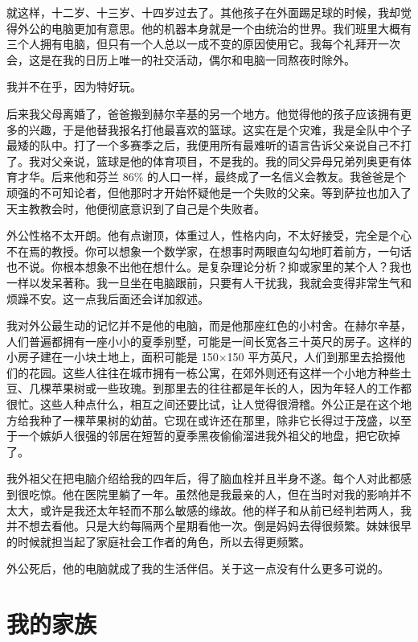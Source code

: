 就这样，十二岁、十三岁、十四岁过去了。其他孩子在外面踢足球的时候，我却觉得外公的电脑更加有意思。他的机器本身就是一个由统治的世界。我们班里大概有三个人拥有电脑，但只有一个人总以一成不变的原因使用它。我每个礼拜开一次会，这是在我的日历上唯一的社交活动，偶尔和电脑一同熬夜时除外。

我并不在乎，因为特好玩。

后来我父母离婚了，爸爸搬到赫尔辛基的另一个地方。他觉得他的孩子应该拥有更多的兴趣，于是他替我报名打他最喜欢的篮球。这实在是个灾难，我是全队中个子最矮的队中。打了一个多赛季之后，我便用所有最难听的语言告诉父亲说自己不打了。我对父亲说，篮球是他的体育项目，不是我的。我的同父异母兄弟列奥更有体育才华。后来他和芬兰 86\% 的人口一样，最终成了一名信义会教友。我爸爸是个顽强的不可知论者，但他那时才开始怀疑他是一个失败的父亲。等到萨拉也加入了天主教教会时，他便彻底意识到了自己是个失败者。

外公性格不太开朗。他有点谢顶，体重过人，性格内向，不太好接受，完全是个心不在焉的教授。你可以想象一个数学家，在想事时两眼直勾勾地盯着前方，一句话也不说。你根本想象不出他在想什么。是复杂理论分析？抑或家里的某个人？我也一样以发呆著称。我一旦坐在电脑跟前，只要有人干扰我，我就会变得非常生气和烦躁不安。这一点我后面还会详加叙述。

我对外公最生动的记忆并不是他的电脑，而是他那座红色的小村舍。在赫尔辛基，人们普遍都拥有一座小小的夏季别墅，可能是一间长宽各三十英尺的房子。这样的小房子建在一小块土地上，面积可能是 150$\times$150 平方英尺，人们到那里去拾掇他们的花园。这些人往往在城市拥有一栋公寓，在郊外则还有这样一个小地方种些土豆、几棵苹果树或一些玫瑰。到那里去的往往都是年长的人，因为年轻人的工作都很忙。这些人种点什么，相互之间还要比试，让人觉得很滑稽。外公正是在这个地方给我种了一棵苹果树的幼苗。它现在或许还在那里，除非它长得过于茂盛，以至于一个嫉妒人很强的邻居在短暂的夏季黑夜偷偷溜进我外祖父的地盘，把它砍掉了。

我外祖父在把电脑介绍给我的四年后，得了脑血栓并且半身不遂。每个人对此都感到很吃惊。他在医院里躺了一年。虽然他是我最亲的人，但在当时对我的影响并不太大，或许是我还太年轻而不那么敏感的缘故。他的样子和从前已经判若两人，我并不想去看他。只是大约每隔两个星期看他一次。倒是妈妈去得很频繁。妹妹很早的时候就担当起了家庭社会工作者的角色，所以去得更频繁。

外公死后，他的电脑就成了我的生活伴侣。关于这一点没有什么更多可说的。

 
\section{我的家族}

